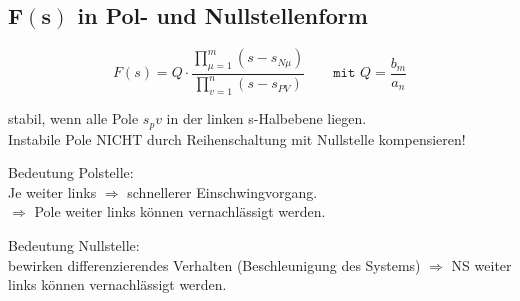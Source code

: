 \subsection{$\mathbf{F(s)}$ in Pol- und Nullstellenform}

\[
	F(s)=Q \cdot \frac{\prod_{\mu=1}^{m}\left(s-s_{N \mu}\right)}{\prod_{v=1}^{n}\left(s-s_{P V}\right)}
	\qquad \texttt{mit } Q = \frac{b_m}{a_n}
\]

\begin{mdframed}[style=exercise]
	stabil, wenn alle Pole $s_pv$ in der linken
	s-Halbebene liegen.\\ Instabile Pole
	NICHT durch Reihenschaltung mit Nullstelle kompensieren!
\end{mdframed}
\begin{mdframed}[style=exercise]
	Bedeutung Polstelle:\\
	Je weiter links $\Rightarrow$ schnellerer Einschwingvorgang.\\
	$\Rightarrow$ Pole weiter links können vernachlässigt werden.
\end{mdframed}
\begin{mdframed}[style=exercise]
	Bedeutung Nullstelle:\\
	bewirken differenzierendes Verhalten (Beschleunigung des Systems)
	$\Rightarrow$ NS weiter links können vernachlässigt werden.
\end{mdframed}

